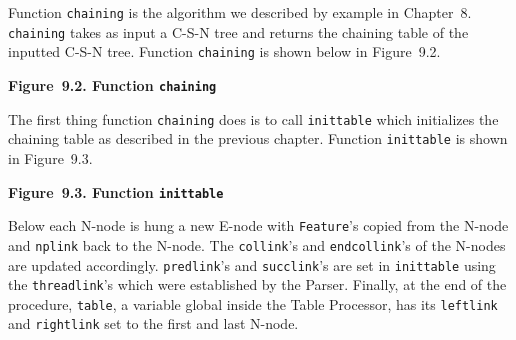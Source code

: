 \documentclass{article}
\begin{document}
Function \texttt{chaining} is the algorithm we described by
example in Chapter~8. \texttt{chaining} takes as input a C-S-N
tree and returns the chaining table of the inputted C-S-N tree.
Function \texttt{chaining} is shown below in Figure~9.2.

\bigbreak
\begin{minipage}{\textwidth}
\vbox{}
\bigbreak
{}
\textbf{Figure~9.2. Function \texttt{chaining}}
\end{minipage}
\bigbreak

The first thing function \texttt{chaining} does is to call
\texttt{inittable} which initializes the chaining table as
described in the previous chapter. Function \texttt{inittable}
is shown in Figure~9.3.

\bigbreak
\begin{minipage}{\textwidth}
\vbox{}
\bigbreak
{}
\textbf{Figure~9.3. Function \texttt{inittable}}
\end{minipage}
\bigbreak

Below each N-node is hung a new E-node with \texttt{Feature}'s
copied from the N-node and \texttt{nplink} back to the
N-node. The \texttt{collink}'s and \texttt{endcollink}'s of the
N-nodes are updated accordingly. \texttt{predlink}'s and
\texttt{succlink}'s are set in \texttt{inittable} using the
\texttt{threadlink}'s which were established by the Parser.
Finally, at the end of the procedure, \texttt{table}, a variable
global inside the Table Processor, has its \texttt{leftlink} and
\texttt{rightlink} set to the first and last N-node.
\end{document}
